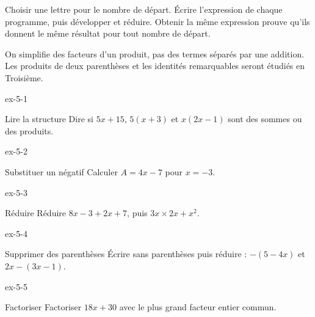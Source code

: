 \begin{savoirfaire}Choisir une lettre pour le nombre de départ. Écrire l’expression de chaque programme, puis développer et réduire. Obtenir la même expression prouve qu’ils donnent le même résultat pour tout nombre de départ.\end{savoirfaire}
\begin{attention}On simplifie des facteurs d’un produit, pas des termes séparés par une addition. Les produits de deux parenthèses et les identités remarquables seront étudiés en Troisième.\end{attention}

\clearpage{}
\begin{blocLivre}{ex-5-1}\begin{exercice}[1]{Lire la structure}
Dire si $5x+15$, $5(x+3)$ et $x(2x-1)$ sont des sommes ou des produits.
\end{exercice}\end{blocLivre}
\begin{blocLivre}{ex-5-2}\begin{exercice}[1]{Substituer un négatif}
Calculer $A=4x-7$ pour $x=-3$.
\end{exercice}\end{blocLivre}
\begin{blocLivre}{ex-5-3}\begin{exercice}[1]{Réduire}
Réduire $8x-3+2x+7$, puis $3x\times2x+x^2$.
\end{exercice}\end{blocLivre}
\begin{blocLivre}{ex-5-4}\begin{exercice}[1]{Supprimer des parenthèses}
Écrire sans parenthèses puis réduire : $-(5-4x)$ et $2x-(3x-1)$.
\end{exercice}\end{blocLivre}
\begin{blocLivre}{ex-5-5}\begin{exercice}[1]{Factoriser}
Factoriser $18x+30$ avec le plus grand facteur entier commun.
\end{exercice}\end{blocLivre}

